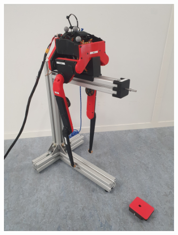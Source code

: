 \documentclass[a4paper,10pt]{article}
\begin{document}
\begin{figure}[H]
\centering

\begin{subfigure}{.5\textwidth}
\centering
  \includegraphics[width=1\linewidth, angle=0, scale=0.8]{./images/Bolt_stand_1.jpg}
\end{subfigure}%
\begin{subfigure}{.5\textwidth}
\centering

\end{subfigure}
\end{figure}
\end{document}
